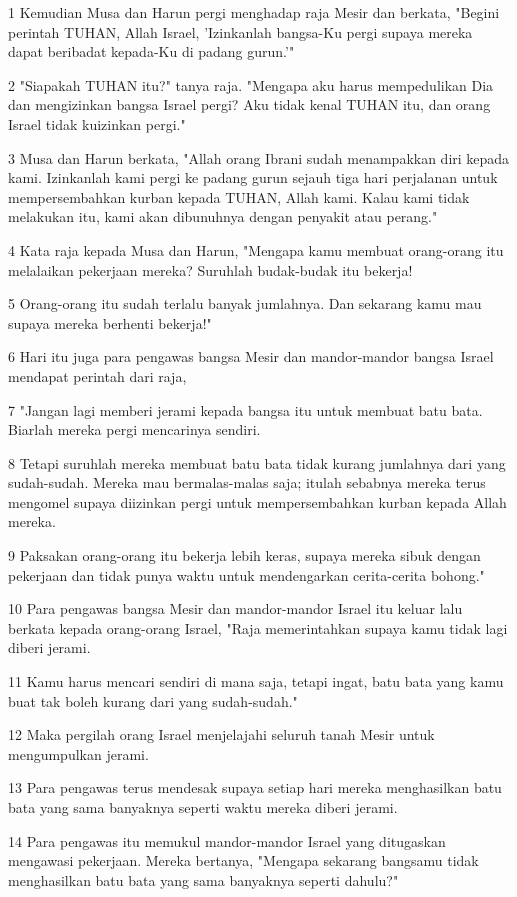 \par 1 Kemudian Musa dan Harun pergi menghadap raja Mesir dan berkata, "Begini perintah TUHAN, Allah Israel, 'Izinkanlah bangsa-Ku pergi supaya mereka dapat beribadat kepada-Ku di padang gurun.'"
\par 2 "Siapakah TUHAN itu?" tanya raja. "Mengapa aku harus mempedulikan Dia dan mengizinkan bangsa Israel pergi? Aku tidak kenal TUHAN itu, dan orang Israel tidak kuizinkan pergi."
\par 3 Musa dan Harun berkata, "Allah orang Ibrani sudah menampakkan diri kepada kami. Izinkanlah kami pergi ke padang gurun sejauh tiga hari perjalanan untuk mempersembahkan kurban kepada TUHAN, Allah kami. Kalau kami tidak melakukan itu, kami akan dibunuhnya dengan penyakit atau perang."
\par 4 Kata raja kepada Musa dan Harun, "Mengapa kamu membuat orang-orang itu melalaikan pekerjaan mereka? Suruhlah budak-budak itu bekerja!
\par 5 Orang-orang itu sudah terlalu banyak jumlahnya. Dan sekarang kamu mau supaya mereka berhenti bekerja!"
\par 6 Hari itu juga para pengawas bangsa Mesir dan mandor-mandor bangsa Israel mendapat perintah dari raja,
\par 7 "Jangan lagi memberi jerami kepada bangsa itu untuk membuat batu bata. Biarlah mereka pergi mencarinya sendiri.
\par 8 Tetapi suruhlah mereka membuat batu bata tidak kurang jumlahnya dari yang sudah-sudah. Mereka mau bermalas-malas saja; itulah sebabnya mereka terus mengomel supaya diizinkan pergi untuk mempersembahkan kurban kepada Allah mereka.
\par 9 Paksakan orang-orang itu bekerja lebih keras, supaya mereka sibuk dengan pekerjaan dan tidak punya waktu untuk mendengarkan cerita-cerita bohong."
\par 10 Para pengawas bangsa Mesir dan mandor-mandor Israel itu keluar lalu berkata kepada orang-orang Israel, "Raja memerintahkan supaya kamu tidak lagi diberi jerami.
\par 11 Kamu harus mencari sendiri di mana saja, tetapi ingat, batu bata yang kamu buat tak boleh kurang dari yang sudah-sudah."
\par 12 Maka pergilah orang Israel menjelajahi seluruh tanah Mesir untuk mengumpulkan jerami.
\par 13 Para pengawas terus mendesak supaya setiap hari mereka menghasilkan batu bata yang sama banyaknya seperti waktu mereka diberi jerami.
\par 14 Para pengawas itu memukul mandor-mandor Israel yang ditugaskan mengawasi pekerjaan. Mereka bertanya, "Mengapa sekarang bangsamu tidak menghasilkan batu bata yang sama banyaknya seperti dahulu?"
